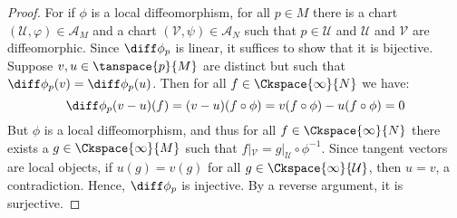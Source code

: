 \documentclass{article}                                                        %
\begin{document}
            \begin{proof}
                For if $\phi$ is a local diffeomorphism, for all $p\in{M}$ there
                is a chart $(\mathcal{U},\varphi)\in\mathcal{A}_{M}$ and a
                chart $(\mathcal{V},\psi)\in\mathcal{A}_{N}$ such that
                $p\in\mathcal{U}$ and $\mathcal{U}$ and $\mathcal{V}$ are
                diffeomorphic. Since $\diff\phi_{p}$ is linear, it suffices to
                show that it is bijective. Suppose $v,u\in\tanspace{p}{M}$ are
                distinct but such that $\diff\phi_{p}(v)=\diff\phi_{p}(u)$.
                Then for all $f\in\Ckspace{\infty}{N}$ we have:
                \begin{equation}
                    \diff\phi_{p}(v-u)(f)=(v-u)(f\circ\phi)
                    =v(f\circ\phi)-u(f\circ\phi)=0
                \end{equation}
                But $\phi$ is a local diffeomorphism, and thus for all
                $f\in\Ckspace{\infty}{N}$ there exists a
                $g\in\Ckspace{\infty}{M}$ such that
                $f|_{\mathcal{V}}=g|_{\mathcal{U}}\circ\phi^{\minus{1}}$. Since
                tangent vectors are local objects, if $u(g)=v(g)$ for all
                $g\in\Ckspace{\infty}{\mathcal{U}}$, then $u=v$, a
                contradiction. Hence, $\diff\phi_{p}$ is injective. By a reverse
                argument, it is surjective.
            \end{proof}
\end{document}

